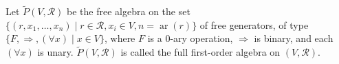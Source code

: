 Let $\tilde{P}(V, \mathcal{R})$ be the free algebra on the set $\{(r, x_1, \ldots, x_n) \mid r \in \mathcal{R}, x_i \in V, n = \operatorname{ar}(r)\}$ of free generators, of type $\{F, \Rightarrow, (\forall x) \mid x \in V\}$, where $F$ is a 0-ary operation, $\Rightarrow$ is binary, and each $(\forall x)$ is unary. $\tilde{P}(V, \mathcal{R})$ is called the full first-order algebra on $(V, \mathcal{R})$.
